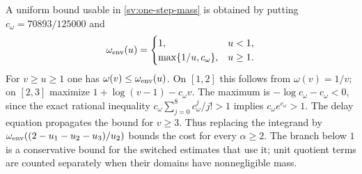 A uniform bound usable in \eqref{sv:one-step-mass} is obtained by
putting $c_\omega=70893/125000$ and
\begin{equation}\label{sv:omega-envelope}
 \omega_{\rm env}(u)=
 \begin{cases}
 1,&u<1,\\
 \max\{1/u,c_\omega\},&u\ge1.
 \end{cases}
\end{equation}
For $v\ge u\ge1$ one has $\omega(v)\le\omega_{\rm env}(u)$.
On $[1,2]$ this follows from $\omega(v)=1/v$; on $[2,3]$
maximize $1+\log(v-1)-c_\omega v$.  The maximum is
$-\log c_\omega-c_\omega<0$, since the exact rational inequality
$c_\omega\sum_{j=0}^8c_\omega^j/j!>1$ implies
$c_\omega e^{c_\omega}>1$.  The delay equation propagates the
bound for $v\ge3$.  Thus replacing the integrand by
$\omega_{\rm env}((2-u_1-u_2-u_3)/u_2)$ bounds the cost for every
$\alpha\ge2$.  The branch below $1$ is a conservative bound for
the switched estimates that use it; unit quotient terms are counted
separately when their domains have nonnegligible mass.

